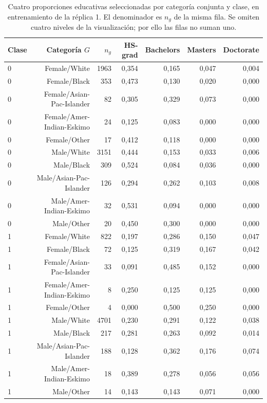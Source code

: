\documentclass[11pt,a4paper]{article}
\begin{document}
\begin{table}[H]
\centering
\caption[Cuatro proporciones educativas seleccionadas por categoría conjunta y clase, en entrenamiento de la réplica 1.]{Cuatro proporciones educativas seleccionadas por categoría conjunta y clase, en entrenamiento de la réplica 1. El denominador es $n_g$ de la misma fila. Se omiten cuatro niveles de la visualización; por ello las filas no suman uno.}\label{tab:propedu}
\small
\setlength{\tabcolsep}{4pt}
\begin{tabular}{lrrrrrr}
\toprule
Clase & Categoría $G$ & $n_g$ & HS-grad & Bachelors & Masters & Doctorate \\
\midrule
0 & Female/White & 1963 & 0,354 & 0,165 & 0,047 & 0,004 \\
0 & Female/Black & 353 & 0,473 & 0,130 & 0,020 & 0,000 \\
0 & Female/Asian-Pac-Islander & 82 & 0,305 & 0,329 & 0,073 & 0,000 \\
0 & Female/Amer-Indian-Eskimo & 24 & 0,125 & 0,083 & 0,000 & 0,000 \\
0 & Female/Other & 17 & 0,412 & 0,118 & 0,000 & 0,000 \\
0 & Male/White & 3151 & 0,444 & 0,153 & 0,033 & 0,006 \\
0 & Male/Black & 309 & 0,524 & 0,084 & 0,036 & 0,000 \\
0 & Male/Asian-Pac-Islander & 126 & 0,294 & 0,262 & 0,103 & 0,008 \\
0 & Male/Amer-Indian-Eskimo & 32 & 0,531 & 0,094 & 0,000 & 0,000 \\
0 & Male/Other & 20 & 0,450 & 0,300 & 0,000 & 0,000 \\
1 & Female/White & 822 & 0,197 & 0,286 & 0,150 & 0,047 \\
1 & Female/Black & 72 & 0,125 & 0,319 & 0,167 & 0,042 \\
1 & Female/Asian-Pac-Islander & 33 & 0,091 & 0,485 & 0,152 & 0,000 \\
1 & Female/Amer-Indian-Eskimo & 8 & 0,250 & 0,125 & 0,125 & 0,000 \\
1 & Female/Other & 4 & 0,000 & 0,500 & 0,250 & 0,000 \\
1 & Male/White & 4701 & 0,230 & 0,291 & 0,122 & 0,038 \\
1 & Male/Black & 217 & 0,281 & 0,263 & 0,092 & 0,014 \\
1 & Male/Asian-Pac-Islander & 188 & 0,128 & 0,362 & 0,176 & 0,074 \\
1 & Male/Amer-Indian-Eskimo & 18 & 0,389 & 0,278 & 0,056 & 0,056 \\
1 & Male/Other & 14 & 0,143 & 0,143 & 0,071 & 0,000 \\
\bottomrule
\end{tabular}
\end{table}
\end{document}
